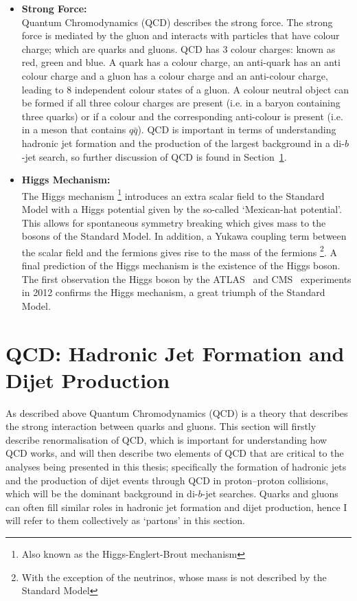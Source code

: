 \begin{itemize}[leftmargin=*]
\item\textbf{Strong Force:}\\
  Quantum Chromodynamics (QCD) describes the strong force.
  The strong force is mediated by the gluon 
  and interacts with particles that have colour charge; which are quarks and gluons.
  QCD has 3 colour charges: known as red, green and blue.
  A quark has a colour charge, an anti-quark has an anti colour charge and 
  a gluon has a colour charge and an anti-colour charge, leading to 8 independent colour states of a gluon.
  A colour neutral object can be formed if all three colour charges are present (i.e. in a baryon containing three quarks)
  or if a colour and the corresponding anti-colour is present (i.e. in a meson that contains $q\bar{q}$).
  QCD is important in terms of understanding hadronic jet formation and the production of the
  largest background in a di-$b$-jet search, so further discussion of QCD is found in Section~\ref{sec:theo-qcd}.\vspace{0.5em}

\item\textbf{Higgs Mechanism:}\\
  The Higgs mechanism \footnote{Also known as the Higgs-Englert-Brout mechanism}
  introduces an extra scalar field to the Standard Model
  with a Higgs potential given by the so-called `Mexican-hat potential'.
  This allows for spontaneous symmetry breaking which gives mass to the bosons of the Standard Model.
  In addition, a Yukawa coupling term between the scalar field and the fermions gives rise to the mass of the fermions
  \footnote{With the exception of the neutrinos, whose mass is not described by the Standard Model}.
  A final prediction of the Higgs mechanism is the existence of the Higgs boson.
  The first observation the Higgs boson by the ATLAS~\cite{theo-higgs_atlas} and CMS~\cite{theo-higgs_cms} experiments
  in 2012 confirms the Higgs mechanism, a great triumph of the Standard Model.
\end{itemize}

\section{QCD: Hadronic Jet Formation and Dijet Production}
\label{sec:theo-qcd}

As described above Quantum Chromodynamics (QCD) is a theory that describes the strong interaction between quarks and gluons.
This section will firstly describe renormalisation of QCD, which is important for understanding how QCD works,
and will then describe two elements of QCD that are critical to the analyses being presented in this thesis;
specifically the formation of hadronic jets and the production of dijet events through QCD in proton--proton collisions,
which will be the dominant background in di-$b$-jet searches.
Quarks and gluons can often fill similar roles in hadronic jet formation and dijet production, hence I will refer to them collectively as `partons' in this section.

